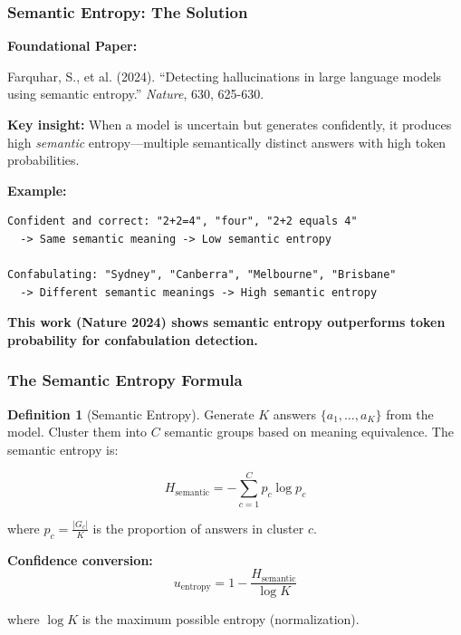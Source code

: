 \documentclass[12pt,a4paper]{article}
\theoremstyle{definition}
\newtheorem{definition}[theorem]{Definition}
\begin{document}
\subsubsection{Semantic Entropy: The Solution}

\begin{priorworkbox}
\textbf{Foundational Paper:}

Farquhar, S., et al. (2024). ``Detecting hallucinations in large language models using semantic entropy.'' \textit{Nature}, 630, 625-630.

\textbf{Key insight:} When a model is uncertain but generates confidently, it produces high \textit{semantic} entropy—multiple semantically distinct answers with high token probabilities.

\textbf{Example:}
\begin{verbatim}
Confident and correct: "2+2=4", "four", "2+2 equals 4"
  -> Same semantic meaning -> Low semantic entropy
  
Confabulating: "Sydney", "Canberra", "Melbourne", "Brisbane"
  -> Different semantic meanings -> High semantic entropy
\end{verbatim}

\textbf{This work (Nature 2024) shows semantic entropy outperforms token probability for confabulation detection.}
\end{priorworkbox}

\subsubsection{The Semantic Entropy Formula}

\begin{definition}[Semantic Entropy]
Generate $K$ answers $\{a_1, \ldots, a_K\}$ from the model. Cluster them into $C$ semantic groups based on meaning equivalence. The semantic entropy is:

\begin{equation}
H_{\text{semantic}} = -\sum_{c=1}^C p_c \log p_c
\end{equation}

where $p_c = \frac{|G_c|}{K}$ is the proportion of answers in cluster $c$.
\end{definition}

\textbf{Confidence conversion:}
\begin{equation}
u_{\text{entropy}} = 1 - \frac{H_{\text{semantic}}}{\log K}
\end{equation}

where $\log K$ is the maximum possible entropy (normalization).
\end{document}

